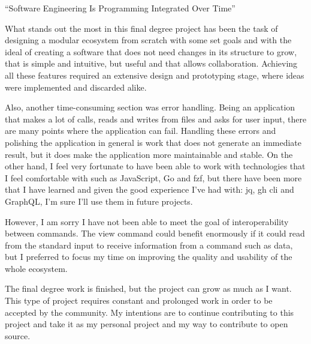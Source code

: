 ``Software Engineering Is Programming Integrated Over Time''

\bigskip
What stands out the most in this final degree project has been the task of designing a modular ecosystem from scratch with some set goals and with the ideal of creating a software that does not need changes in its structure to grow, that is simple and intuitive, but useful and that allows collaboration. Achieving all these features
required an extensive design and prototyping stage, where ideas were implemented and discarded alike.

Also, another time-consuming section was error handling. Being an application that makes a lot of calls, reads and writes from files and asks for user input, there are many points where the application can fail. Handling these errors and polishing the application in general is work that does not generate an immediate result, but it does make the application more maintainable and stable.
On the other hand, I feel very fortunate to have been able to work with technologies that I feel comfortable with such as JavaScript, Go and fzf, but there have been more that I have learned and given the good experience I've had with: jq, gh cli and GraphQL, I'm sure I'll use them in future projects.

However, I am sorry I have not been able to meet the goal of interoperability between commands. The view command could benefit enormously if it could read from the standard input to receive information from a command such as data, but I preferred to focus my time on improving the quality and usability of the whole ecosystem.

The final degree work is finished, but the project can grow as much as I want. This type of project requires constant and prolonged work in order to be accepted by the community. My intentions are to continue contributing to this project and take it as my personal project and my way to contribute to open source.